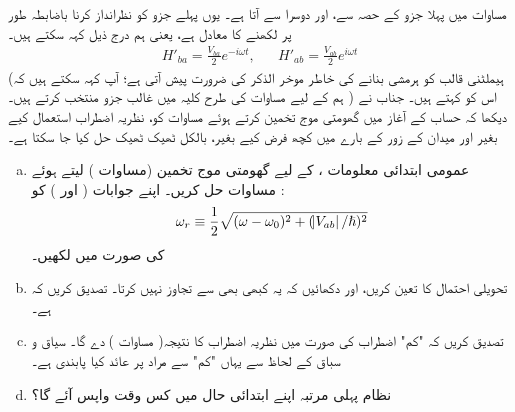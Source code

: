 مساوات   میں پہلا جزو    کے  حصہ  سے، اور  دوسرا  سے آتا ہے۔ یوں پہلے جزو کو  نظرانداز کرنا باضابطہ طور پر  لکھنے کا معادل ہے،  یعنی ہم درج ذیل کہہ سکتے ہیں۔
\begin{align}\label{مساوات_تابع_مضطرب_کوسائن_ایک_جزو}
	H'_{ba}=\frac{V_{ba}}{2}e^{-i\omega t},&&H'_{ab}=\frac{V_{ab}}{2}e^{i\omega t}
\end{align}
(ہیملٹنی قالب کو ہرمشی بنانے کی خاطر موخر الذکر کی ضرورت پیش آتی ہے؛ آپ کہہ سکتے ہیں کہ  ہم  کے لیے مساوات  کی طرح کلیہ میں غالب جزو  منتخب کرتے  ہیں۔ ) اس کو  کہتے ہیں۔ جناب  نے دیکھا کہ حساب کے آغاز میں گھومتی موج تخمین کرتے ہوئے مساوات   کو،   نظریہ اضطراب  استعمال کیے  بغیر  اور میدان کے  زور کے بارے میں کچھ  فرض کیے  بغیر،  بالکل ٹھیک ٹھیک حل کیا جا سکتا ہے۔
\begin{enumerate}[a.]
\item
 عمومی ابتدائی معلومات ،    کے لیے گھومتی موج تخمین  (مساوات )   لیتے ہوئے مساوات   حل کریں۔ اپنے جوابات (  اور )  کو : 
\begin{align}
	\omega_r\equiv\frac{1}{2}\sqrt{(\omega-\omega_0)^2+(\abs{V_{ab}}/\hslash)^2}
\end{align}
کی صورت میں لکھیں۔
\item
 تحویلی  احتمال کا  تعین کریں، اور  دکھائیں کہ یہ کبھی بھی    سے تجاوز نہیں کرتا۔ تصدیق کریں کہ        ہے۔
\item
 تصدیق کریں  کہ "کم"  اضطراب کی صورت میں   نظریہ اضطراب کا نتیجہ(  مساوات )   دے گا۔ سیاق و سباق کے لحاظ سے یہاں "کم" سے مراد      پر عائد کیا  پابندی  ہے۔
\item
 نظام پہلی مرتبہ  اپنے ابتدائی حال میں کس وقت واپس آئے گا؟
 \end{enumerate}



